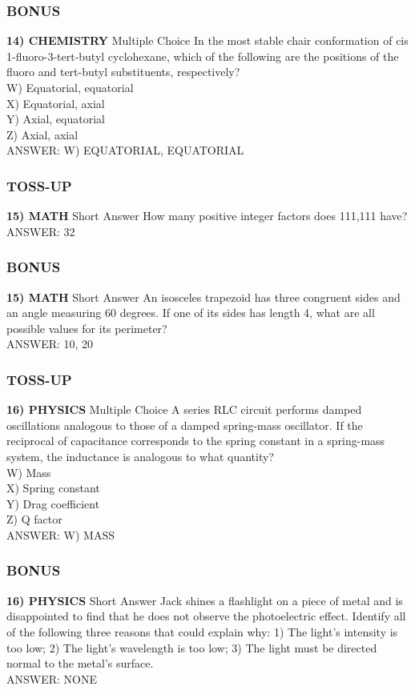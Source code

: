 \subsubsection*{BONUS}
\textbf{14) CHEMISTRY}
Multiple Choice In the most stable chair conformation of cis 1-fluoro-3-tert-butyl cyclohexane, which of the following are the positions of the fluoro and tert-butyl substituents, respectively?
\\W) Equatorial, equatorial
\\X) Equatorial, axial
\\Y) Axial, equatorial
\\Z) Axial, axial
\\ANSWER: W) EQUATORIAL, EQUATORIAL

\subsubsection*{TOSS-UP}
\textbf{15) MATH}
Short Answer How many positive integer factors does 111,111 have?
\\ANSWER: 32

\subsubsection*{BONUS}
\textbf{15) MATH}
Short Answer An isosceles trapezoid has three congruent sides and an angle measuring 60 degrees. If one of its sides has length 4, what are all possible values for its perimeter?
\\ANSWER: 10, 20

\newpage

\subsubsection*{TOSS-UP}
\textbf{16) PHYSICS}
Multiple Choice A series RLC circuit performs damped oscillations analogous to those of a damped spring-mass oscillator. If the reciprocal of capacitance corresponds to the spring constant in a spring-mass system, the inductance is analogous to what quantity?
\\W) Mass
\\X) Spring constant
\\Y) Drag coefficient
\\Z) Q factor
\\ANSWER: W) MASS

\subsubsection*{BONUS}
\textbf{16) PHYSICS}
Short Answer Jack shines a flashlight on a piece of metal and is disappointed to find that he does not observe the photoelectric effect. Identify all of the following three reasons that could explain why: 1) The light's intensity is too low; 2) The light's wavelength is too low; 3) The light must be directed normal to the metal's surface.
\\ANSWER: NONE

